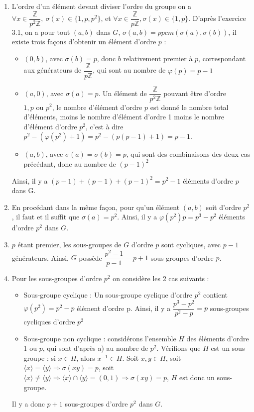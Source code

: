 
\begin{enumerate}[label=\alph*)]
    \item L'ordre d'un élément devant diviser l'ordre du groupe on a $\forall x \in \dfrac{\mathbb{Z}}{p^2\mathbb{Z}},\ \sigma(x) \in \{1,p,p^2\}$, et  $\forall x \in \dfrac{\mathbb{Z}}{p\mathbb{Z}}, \sigma(x) \in \{1,p\}$. D'après l'exercice 3.1, on a pour tout $(a,b)$ dans $G$, $\sigma(a,b) = ppcm(\sigma(a),\sigma(b))$, il existe trois façons d'obtenir un élément d'ordre $p$ : 
    \begin{itemize}
        \item $(0,b)$, avec $\sigma(b)=p$, donc $b$ relativement premier à $p$, correspondant aux générateurs de $\dfrac{\mathbb{Z}}{p \mathbb{Z}}$, qui sont au nombre de $\varphi(p) = p-1$
        \item $(a,0)$, avec $\sigma(a) = p$. Un élément de $\dfrac{\mathbb{Z}}{p^2\mathbb{Z}}$ pouvant être d'ordre $1,p \text{ ou } p^2$, le nombre d'élément d'ordre $p$ est donné le nombre total d'éléments, moins le nombre d'élément d'ordre 1 moins le nombre d'élément d'ordre $p^2$, c'est à dire $p^2 - (\varphi(p^2) + 1) = p^2 - (p(p-1) + 1) = p-1$.
        \item $(a,b)$, avec $\sigma(a)=\sigma(b) = p$, qui sont des combinaisons des deux cas précédant, donc au nombre de $(p-1)^2$
    \end{itemize}

    Ainsi, il y a $(p-1)+(p-1)+(p-1)^2 = p^2-1$ éléments d'ordre $p$ dans G.
    \item  En procédant dans la même façon, pour qu'un élément $(a,b)$ soit d'ordre $p^2$, il faut et il suffit que $\sigma(a)=p^2$. Ainsi, il y a $ \varphi(p^2) p =  p^3-p^2$ éléments d'ordre $p^2$ dans $G$.
    \item $p$ étant premier, les sous-groupes de $G$ d'ordre $p$ sont cycliques, avec $p-1$ générateurs. Ainsi, $G$ possède $\dfrac{p^2-1}{p-1} = p+1$ sous-groupes d'ordre $p$. 
    \item Pour les sous-groupes d'ordre $p^2$ on considère les 2 cas suivants : 
    \begin{itemize}
        \item Sous-groupe cyclique : Un sous-groupe cyclique d'ordre $p^2$ contient $\varphi (p^2) = p^2-p$ élément d'ordre p. Ainsi, il y a $\dfrac{p^3-p^2}{p^2-p}=p$ sous-groupes cycliques d'ordre $p^2$
        \item Sous-groupe non cyclique : considérons l'ensemble $H$ des éléments d'ordre 1 ou $p$, qui sont d'après a) au nombre de $p^2$. Vérifions que $H$ est un sous groupe : si $x\in H$, alors $x^{-1} \in H$. Soit $x,y \in H$, soit $\langle x \rangle = \langle y \rangle \Rightarrow \sigma(xy)=p$, soit $\langle x \rangle \neq \langle y \rangle \Rightarrow \langle x \rangle \cap \langle y \rangle = (0,1) \Rightarrow \sigma(xy)=p$, $H$ est donc un sous-groupe.
    \end{itemize}
    Il y a donc $p+1$ sous-groupes d'ordre $p^2$ dans $G$.
\end{enumerate}
